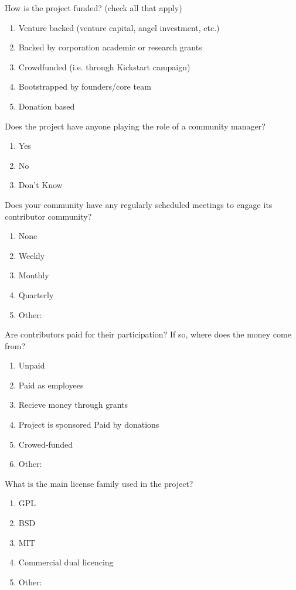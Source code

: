How is the project funded? (check all that apply)
\begin{enumerate}
\item Venture backed (venture capital, angel investment, etc.)
\item Backed by corporation academic or research grants
\item Crowdfunded (i.e. through Kickstart campaign)
\item Bootstrapped by founders/core team
\item Donation based
\end{enumerate}

Does the project have anyone playing the role of a community manager?
\begin{enumerate}
\item Yes
\item No
\item Don't Know
\end{enumerate}

Does your community have any regularly scheduled meetings to engage its contributor community?
\begin{enumerate}
\item None
\item Weekly
\item Monthly
\item Quarterly
\item Other:
\end{enumerate}

Are contributors paid for their participation? If so, where does the money come from?
\begin{enumerate}
\item Unpaid
\item Paid as employees
\item Recieve money through grants
\item Project is sponsored Paid by donations
\item Crowed-funded
\item Other:
\end{enumerate}

What is the main license family used in the project?
\begin{enumerate}
\item GPL
\item BSD
\item MIT
\item Commercial dual licencing
\item Other:
\end{enumerate}

